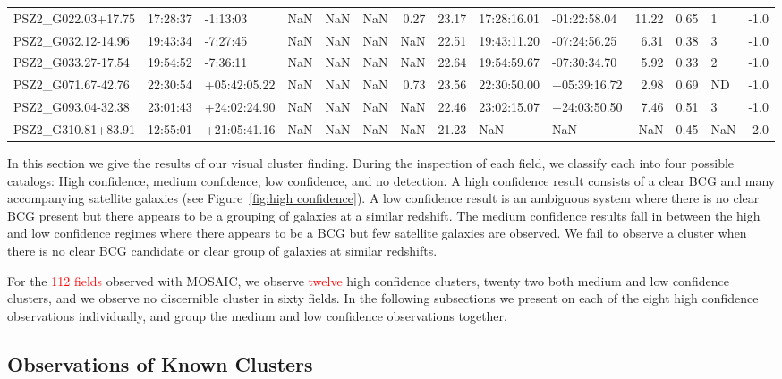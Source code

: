 \documentclass[apj, revtex4]{emulateapj}
\newcommand{\editorial}[1]{\textcolor{red}{#1}}
\begin{document}
\begin{table}
\begin{tabular}{lllrrrrrllrrlr}
 PSZ2\_G022.03+17.75 &  17:28:37 &      -1:13:03 & NaN &  NaN &   NaN & 0.27 &    23.17 &   17:28:16.01 &  -01:22:58.04 &    11.22 &  0.65 &    1 &  -1.0 \\
 PSZ2\_G032.12-14.96 &  19:43:34 &      -7:27:45 & NaN &  NaN &   NaN & NaN &    22.51 &   19:43:11.20 &  -07:24:56.25 &     6.31 &  0.38 &    3 &  -1.0 \\
 PSZ2\_G033.27-17.54 &  19:54:52 &      -7:36:11 & NaN &  NaN &   NaN & NaN &    22.64 &   19:54:59.67 &  -07:30:34.70 &     5.92 &  0.33 &    2 &  -1.0 \\
 PSZ2\_G071.67-42.76 &  22:30:54 &  +05:42:05.22 & NaN &  NaN &   NaN & 0.73 &    23.56 &   22:30:50.00 &  +05:39:16.72 &     2.98 &  0.69 &   ND &  -1.0 \\
 PSZ2\_G093.04-32.38 &  23:01:43 &  +24:02:24.90 & NaN &  NaN &   NaN & NaN &    22.46 &   23:02:15.07 &  +24:03:50.50 &     7.46 &  0.51 &    3 &  -1.0 \\
 PSZ2\_G310.81+83.91 &  12:55:01 &  +21:05:41.16 & NaN &  NaN &   NaN & NaN &    21.23 &           NaN &           NaN &      NaN &  0.45 &  NaN &   2.0 \\
	\hline
\end{tabular}
\label{tbl:preobserved}
\end{table}

In this section we give the results of our visual cluster finding. During the inspection of each field, we classify each into four possible catalogs: High confidence, medium confidence, low confidence, and no detection. A high confidence result consists of a clear BCG and many accompanying satellite galaxies (see Figure~\ref{fig:high confidence}). A low confidence result is an ambiguous system where there is no clear BCG present but there appears to be a grouping of galaxies at a similar redshift. The medium confidence results fall in between the high and low confidence regimes where there appears to be a BCG but few satellite galaxies are observed. We fail to observe a cluster when there is no clear BCG candidate or clear group of galaxies at similar redshifts.

For the \editorial{112 fields} observed with MOSAIC, we observe \editorial{twelve} high confidence clusters, twenty two both medium and low confidence clusters, and we observe no discernible cluster in sixty fields. In the following subsections we present on each of the eight high confidence observations individually, and group the medium and low confidence observations together.

\subsection{Observations of Known Clusters}
\end{document}
